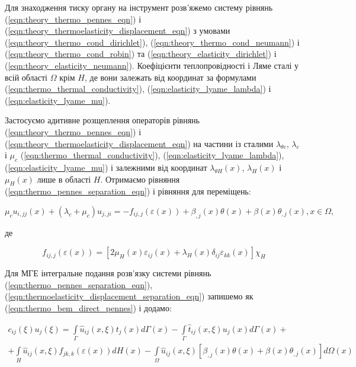 Для знаходження тиску органу на інструмент розв'яжемо систему рівнянь (\ref{eqn:theory_thermo_pennes_eqn}) і
(\ref{eqn:theory_thermoelasticity_displacement_eqn}) з умовами (\ref{eqn:theory_thermo_cond_dirichlet}),
(\ref{eqn:theory_thermo_cond_neumann}) і (\ref{eqn:theory_thermo_cond_robin}) та (\ref{eqn:theory_elasticity_dirichlet})
і (\ref{eqn:theory_elasticity_neumann}). Коефіцієнти теплопровідності і Ляме сталі у всій області $\Omega$ крім $H$, де
вони залежать від координат за формулами (\ref{eqn:thermo_thermal_conductivity}), (\ref{eqn:elasticity_lyame_lambda}) і
(\ref{eqn:elasticity_lyame_mu}).

Застосуємо адитивне розщеплення операторів рівнянь (\ref{eqn:theory_thermo_pennes_eqn}) і
(\ref{eqn:theory_thermoelasticity_displacement_eqn}) на частини із сталими $\lambda_{\theta c}$, $\lambda_c$ і $\mu_c$
(\ref{eqn:thermo_thermal_conductivity}), (\ref{eqn:elasticity_lyame_lambda}), (\ref{eqn:elasticity_lyame_mu}) і
залежними від координат $\lambda_{\theta H}(x)$, $\lambda_H(x)$ і $\mu_H(x)$ лише в області $H$. Отримаємо рівняння
(\ref{eqn:thermo_pennes_separation_eqn}) і рівняння для переміщень:

\begin{equation}
  \label{eqn:thermoelasticity_displacement_separation_eqn}
  \mu_c u_{i,jj}(x) + (\lambda_c + \mu_c)u_{j,ji} = -f_{ij,j}(\varepsilon(x)) + \beta_{,j}(x) \theta(x) + 
      \beta(x) \theta_{,j}(x) , x \in \Omega,
\end{equation}

\noindent де

\begin{equation*}
  f_{ij,j}(\varepsilon(x)) = [ 2\mu_H(x)\varepsilon_{ij}(x) + \lambda_H(x) \delta_{ij} \varepsilon_{kk}(x) ] \chi_H
\end{equation*}

Для МГЕ інтегральне подання розв'язку системи рівнянь (\ref{eqn:thermo_pennes_separation_eqn}), 
(\ref{eqn:thermoelasticity_displacement_separation_eqn}) запишемо як (\ref{eqn:thermo_bem_direct_pennes}) і додамо:

\begin{equation}
  \label{eqn:elasticity_bem_direct_thermoelasticity}
  \begin{split}
  c_{ij}(\xi) u_j(\xi) = \int \limits_{\Gamma}\hat{u}_{ij}(x,\xi)t_j(x)d\Gamma(x) - 
      \int \limits_{\Gamma}\hat{t}_{ij}(x,\xi)u_j(x)d\Gamma(x) + \\  
      + \int \limits_H \hat{u}_{ij}(x,\xi)f_{jk,k}(\varepsilon(x))dH(x)
      - \int \limits_{\Omega} \hat{u}_{ij}(x,\xi)[\beta_{,j}(x)\theta(x)+\beta(x)\theta_{,j}(x)]d\Omega(x)
  \end{split}
\end{equation}

